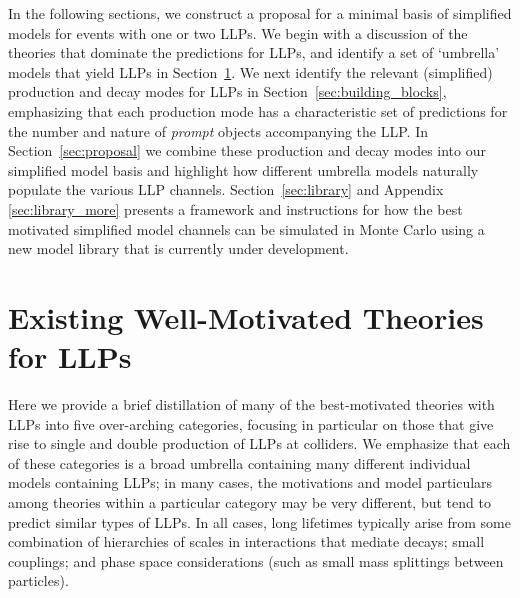 In the following sections, we construct a proposal for a minimal basis of simplified models for events with one or two LLPs.
We begin with a discussion of the theories that dominate the predictions for LLPs, and identify a set of `umbrella' models that yield LLPs in Section~\ref{sec:motivated_theories}.  We next identify the relevant (simplified) production and decay modes for LLPs in Section~\ref{sec:building_blocks},  emphasizing that each production mode has a characteristic set of predictions for the number and nature of {\em prompt} objects accompanying the LLP.  In Section~\ref{sec:proposal} we combine these production and decay modes into our simplified model basis and highlight how different umbrella models naturally populate the various LLP channels.  Section~\ref{sec:library} and Appendix  \ref{sec:library_more}  presents a framework and instructions for how the best motivated simplified model channels can be simulated in Monte Carlo using a new model library that is currently under development. 


\section{Existing Well-Motivated Theories for LLPs}\label{sec:motivated_theories}

Here we provide a brief distillation of many of the best-motivated theories with LLPs into five over-arching categories, focusing in particular on those that give rise to single and double production of LLPs at colliders.  We emphasize that each of these categories is a broad umbrella containing many different individual models containing LLPs; in many cases, the motivations and model particulars among theories within a particular category may be very different, but  tend to predict similar types of LLPs. In all cases, long lifetimes typically arise from some combination of hierarchies of scales in interactions that mediate decays; small couplings; and phase space considerations (such as small mass splittings between particles).

